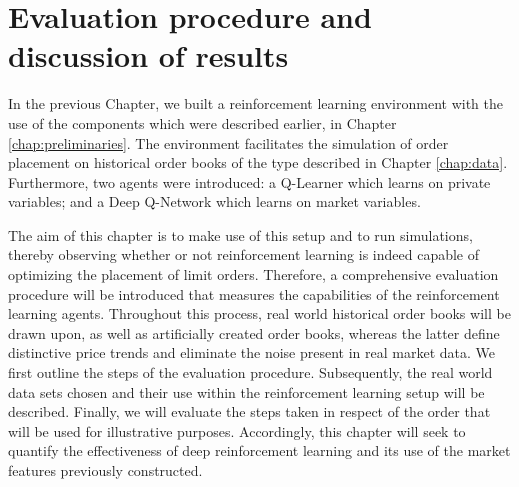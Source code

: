\chapter{Evaluation procedure and discussion of results}
\label{chap:analysis}

In the previous Chapter, we built a reinforcement learning environment with the use of the components which were described earlier, in Chapter \ref{chap:preliminaries}.
The environment facilitates the simulation of order placement on historical order books of the type described in Chapter \ref{chap:data}.
Furthermore, two agents were introduced: a Q-Learner which learns on private variables; and a Deep Q-Network which learns on market variables.

The aim of this chapter is to make use of this setup and to run simulations, thereby observing whether or not reinforcement learning is indeed capable of optimizing the placement of limit orders.
Therefore, a comprehensive evaluation procedure will be introduced that  measures the capabilities of the reinforcement learning agents.
Throughout this process, real world historical order books will be drawn upon, as well as artificially created order books, whereas the latter define distinctive price trends and eliminate the noise present in real market data.
We first outline the steps of the evaluation procedure.
Subsequently, the real world data sets chosen and their use within the reinforcement learning setup will be described.
Finally, we will evaluate the steps taken in respect of the order that will be used for illustrative purposes.
Accordingly, this chapter will seek to quantify the effectiveness of deep reinforcement learning and its use of the market features previously constructed.

